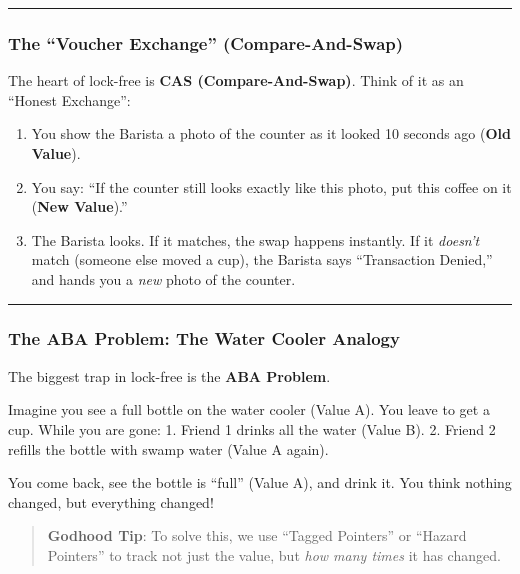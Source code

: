 \begin{center}\rule{0.5\linewidth}{0.5pt}\end{center}

\hypertarget{the-voucher-exchange-compare-and-swap}{%
\subsubsection{The ``Voucher Exchange''
(Compare-And-Swap)}\label{the-voucher-exchange-compare-and-swap}}

The heart of lock-free is \textbf{CAS (Compare-And-Swap)}. Think of it
as an ``Honest Exchange'':

\begin{enumerate}
\def\labelenumi{\arabic{enumi}.}
\tightlist
\item
  You show the Barista a photo of the counter as it looked 10 seconds
  ago (\textbf{Old Value}).
\item
  You say: ``If the counter still looks exactly like this photo, put
  this coffee on it (\textbf{New Value}).''
\item
  The Barista looks. If it matches, the swap happens instantly. If it
  \emph{doesn't} match (someone else moved a cup), the Barista says
  ``Transaction Denied,'' and hands you a \emph{new} photo of the
  counter.
\end{enumerate}

\begin{center}\rule{0.5\linewidth}{0.5pt}\end{center}

\hypertarget{the-aba-problem-the-water-cooler-analogy}{%
\subsubsection{The ABA Problem: The Water Cooler
Analogy}\label{the-aba-problem-the-water-cooler-analogy}}

The biggest trap in lock-free is the \textbf{ABA Problem}.

Imagine you see a full bottle on the water cooler (Value A). You leave
to get a cup. While you are gone: 1. Friend 1 drinks all the water
(Value B). 2. Friend 2 refills the bottle with swamp water (Value A
again).

You come back, see the bottle is ``full'' (Value A), and drink it. You
think nothing changed, but everything changed!

\begin{quote}
\textbf{Godhood Tip}: To solve this, we use ``Tagged Pointers'' or
``Hazard Pointers'' to track not just the value, but \emph{how many
times} it has changed.
\end{quote}

